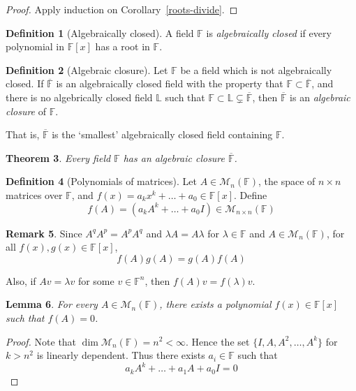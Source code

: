 \documentclass[10pt,fleqn]{article}
\newcommand{\field}{\mathbb{F}}
\newcommand{\mat}{\mathcal{M}}
\theoremstyle{definition} \newtheorem{defn}{Definition}[section]
\theoremstyle{plain}      \newtheorem{thm}[defn]{Theorem}
\theoremstyle{plain}      \newtheorem{prop}[defn]{Proposition}
\theoremstyle{plain}      \newtheorem{lem}[defn]{Lemma}
\theoremstyle{plain}      \newtheorem{cor}[defn]{Corollary}
\theoremstyle{plain}      \newtheorem{ad}[defn]{Addendum}
\theoremstyle{definition} \newtheorem{ex}[defn]{Example}
\theoremstyle{definition} \newtheorem{rem}[defn]{Remark}
\numberwithin{equation}{subsection}
\begin{document}
\begin{proof}
    Apply induction on Corollary~\ref{roots-divide}.
\end{proof}

\begin{defn}[Algebraically closed]
    A field $\field$ is \emph{algebraically closed} if every polynomial in $\field[x]$ has a root in $\field$.
\end{defn}

\begin{defn}[Algebraic closure]
    Let $\field$ be a field which is not algebraically closed.
    If $\overline{\field}$ is an algebraically closed field with the property that $\field\subset\overline{\field}$, and there is no algebrically closed field $\mathbb{L}$ such that $\field\subset\mathbb{L}\subsetneq\overline{\field}$, then $\overline{\field}$ is an \emph{algebraic closure} of $\field$.

    That is, $\overline{\field}$ is the `smallest' algebraically closed field containing $\field$.
\end{defn}

\begin{thm}
    Every field $\field$ has an algebraic closure $\overline{\field}$.
\end{thm}

\begin{defn}[Polynomials of matrices]
    Let $A\in\mat_n(\field)$, the space of $n\times n$ matrices over $\field$, and $f(x)=a_kx^k+\ldots+a_0\in\field[x]$.
    Define
    \[
        f(A)=
        (a_kA^k+\ldots+a_0I)\in
        \mat_{n\times n}(\field)
    \]
\end{defn}

\begin{rem}
    Since $A^qA^p=A^pA^q$ and $\lambda A=A\lambda$ for $\lambda\in\field$ and $A\in\mat_n(\field)$, for all $f(x),g(x)\in\field[x]$,
    \[
        f(A)g(A)=
        g(A)f(A)
    \]

    Also, if $Av=\lambda v$ for some $v\in\field^n$, then $f(A)v=f(\lambda)v$.
\end{rem}

\begin{lem}
    For every $A\in\mat_n(\field)$, there exists a polynomial $f(x)\in\field[x]$ such that $f(A)=0$.
\end{lem}

\begin{proof}
    Note that $\dim\mat_n(\field)=n^2<\infty$.
    Hence the set $\{I,A,A^2,\ldots,A^k\}$ for $k>n^2$ is linearly dependent.
    Thus there exists $a_i\in\field$ such that
    \[
        a_kA^k+\ldots+a_1A+a_0I=
        0
    \]
\end{proof}
\end{document}
